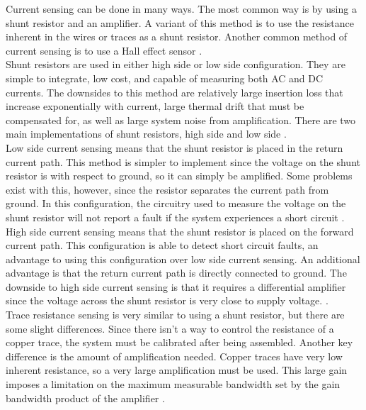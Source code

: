 Current sensing can be done in many ways. The most common way is by using a shunt resistor and an amplifier. A variant of this method is to use the resistance inherent in the wires or traces as a shunt resistor. Another common method of current sensing is to use a Hall effect sensor \cite{Current_Sensing}. \\
\newline
Shunt resistors are used in either high side or low side configuration. They are simple to integrate, low cost, and capable of measuring both AC and DC currents. The downsides to this method are relatively large insertion loss that increase exponentially with current, large thermal drift that must be compensated for, as well as large system noise from amplification. There are two main implementations of shunt resistors, high side and low side \cite{Current_Sensing}. \\
\newline
Low side current sensing means that the shunt resistor is placed in the return current path. This method is simpler to implement since the voltage on the shunt resistor is with respect to ground, so it can simply be amplified. Some problems exist with this, however, since the resistor separates the current path from ground. In this configuration, the circuitry used to measure the voltage on the shunt resistor will not report a fault if the system experiences a short circuit \cite{Current_Sensing}. \\
\newline 
High side current sensing means that the shunt resistor is placed on the forward current path. This configuration is able to detect short circuit faults, an advantage to using this configuration over low side current sensing. An additional advantage is that the return current path is directly connected to ground. The downside to high side current sensing is that it requires a differential amplifier since the voltage across the shunt resistor is very close to supply voltage. \cite{Current_Sensing}. \\
\newline
Trace resistance sensing is very similar to using a shunt resistor, but there are some slight differences. Since there isn't a way to control the resistance of a copper trace, the system must be calibrated after being assembled. Another key difference is the amount of amplification needed. Copper traces have very low inherent resistance, so a very large amplification must be used. This large gain imposes a limitation on the maximum measurable bandwidth set by the gain bandwidth product of the amplifier \cite{Current_Sensing}. \\
